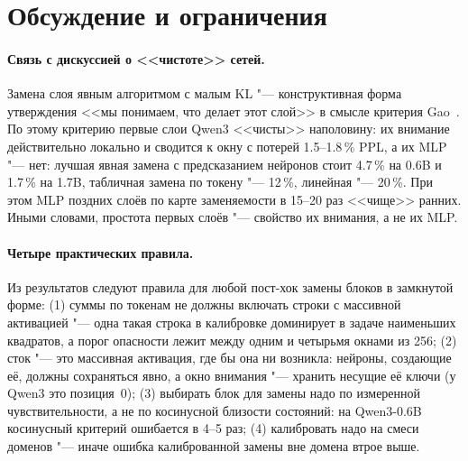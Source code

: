 \section{Обсуждение и ограничения}\label{sec:discussion}

\paragraph{Связь с дискуссией о <<чистоте>> сетей.}
Замена слоя явным алгоритмом с малым KL "--- конструктивная форма
утверждения <<мы понимаем, что делает этот слой>> в смысле критерия
Gao~\cite{gao_notclean}. По этому критерию первые слои Qwen3 <<чисты>>
наполовину: их внимание действительно локально и сводится к окну с
потерей 1.5--1.8\,\% PPL, а их MLP "--- нет: лучшая явная замена с
предсказанием нейронов стоит 4.7\,\% на 0.6B и 1.7\,\% на 1.7B, табличная
замена по токену "--- 12\,\%, линейная "--- 20\,\%. При этом MLP поздних
слоёв по карте заменяемости в 15--20 раз <<чище>> ранних. Иными словами,
простота первых слоёв "--- свойство их внимания, а не их MLP.

\paragraph{Четыре практических правила.} Из результатов следуют правила
для любой пост-хок замены блоков в замкнутой форме: (1) суммы по токенам
не должны включать строки с массивной активацией "--- одна такая строка
в калибровке доминирует в задаче наименьших квадратов, а порог опасности
лежит между одним и четырьмя окнами из 256; (2) сток "--- это массивная активация, где бы она ни возникла:
нейроны, создающие её, должны сохраняться явно, а окно внимания "---
хранить несущие её ключи (у Qwen3 это позиция~0); (3) выбирать блок для замены
надо по измеренной чувствительности, а не по косинусной близости
состояний: на Qwen3-0.6B косинусный критерий ошибается в 4--5 раз;
(4) калибровать надо на смеси доменов "--- иначе ошибка калиброванной
замены вне домена втрое выше.

